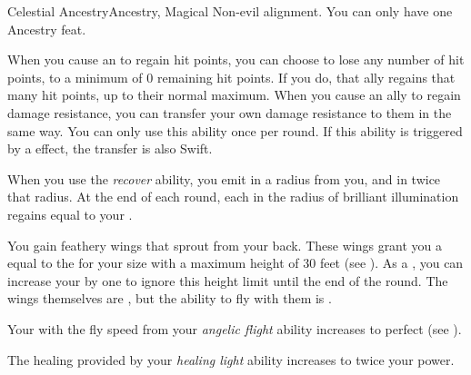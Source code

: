     \begin{magicalfeat}{Celestial Ancestry}{Ancestry, Magical}
        \featpre Non-evil alignment.
         You can only have one Ancestry feat.

         When you cause an  to regain hit points, you can choose to lose any number of hit points, to a minimum of 0 remaining hit points.
        If you do, that ally regains that many hit points, up to their normal maximum.
        When you cause an ally to regain damage resistance, you can transfer your own damage resistance to them in the same way.
        You can only use this ability once per round.
        If this ability is triggered by a  effect, the transfer is also Swift.

         When you use the \textit{recover} ability, you  emit  in a \largearea radius  from you, and  in twice that radius.
        At the end of each round, each  in the radius of brilliant illumination regains  equal to your .

         You gain feathery wings that sprout from your back.
        These wings grant you a  equal to the  for your size with a maximum height of 30 feet (see ).
        As a , you can increase your  by one to ignore this height limit until the end of the round.
        The wings themselves are , but the ability to fly with them is \magical.

         Your  with the fly speed from your \textit{angelic flight} ability increases to perfect (see ).

         The healing provided by your \textit{healing light} ability increases to twice your power.
    \end{magicalfeat}


